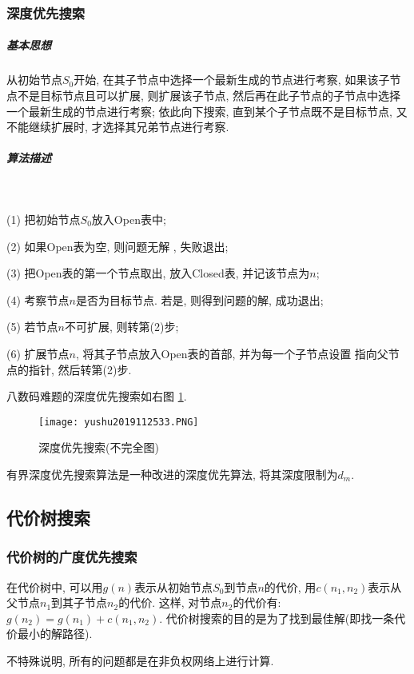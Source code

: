 \subsubsection{深度优先搜索}
\subparagraph{基本思想}
    从初始节点$S_0$开始, 在其子节点中选择一个最新生成的节点进行考察, 如果该子节点不是目标节点且可以扩展, 则扩展该子节点, 然后再在此子节点的子节点中选择一个最新生成的节点进行考察;
    依此向下搜索, 直到某个子节点既不是目标节点, 又不能继续扩展时, 才选择其兄弟节点进行考察.
\subparagraph{算法描述}~{}

\quad   (1) 把初始节点$S_0$放入Open表中;

\quad   (2) 如果Open表为空, 则问题无解 , 失败退出;

\quad   (3) 把Open表的第一个节点取出, 放入Closed表, 并记该节点为$n$;

\quad   (4) 考察节点$n$是否为目标节点. 若是, 则得到问题的解, 成功退出;

\quad   (5) 若节点$n$不可扩展, 则转第(2)步;

\quad   (6) 扩展节点$n$, 将其子节点放入Open表的首部, 并为每一个子节点设置 指向父节点的指针, 然后转第(2)步.
\begin{example}
    \quad 八数码难题的深度优先搜索如右图 \ref{AI32fig33}.
\end{example}
\begin{figure}[H]
    \centering
    \texttt{[image: yushu2019112533.PNG]}
    \caption{深度优先搜索(不完全图) }
    \label{AI32fig33}
\end{figure}
\begin{remark}
    有界深度优先搜索算法是一种改进的深度优先算法, 将其深度限制为$d_m$.
\end{remark}
\subsection{代价树搜索}
\subsubsection{代价树的广度优先搜索}
    在代价树中, 可以用$g(n)$表示从初始节点$S_0$到节点$n$的代价, 用$c(n_1, n_2)$表示从父节点$n_1$到其子节点$n_2$的代价.
这样, 对节点$n_2$的代价有: $g(n_2)=g(n_1)+c(n_1, n_2)$. 代价树搜索的目的是为了找到最佳解(即找一条代价最小的解路径).
\begin{remark}
  不特殊说明, 所有的问题都是在非负权网络上进行计算.
\end{remark}
